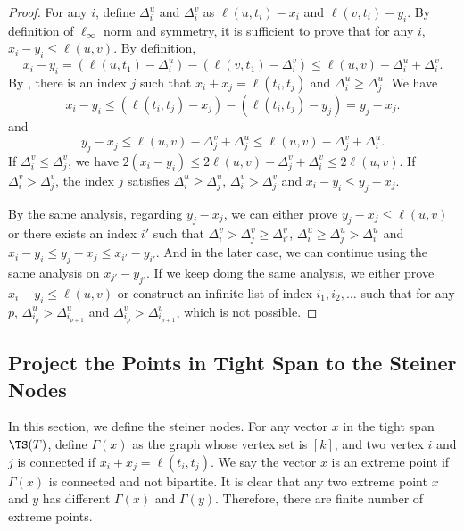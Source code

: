 \begin{proof}
    For any $i$, define $\Delta^u_i$ and $\Delta^v_i$ as $\ell(u,t_i) - x_i$ and $\ell(v,t_i) - y_i$. By definition of $\ell_{\infty}$ norm and symmetry, it is sufficient to prove that for any $i$, $x_i-y_i \le \ell(u,v)$. By definition, 
    $$x_i-y_i = (\ell(u,t_1) - \Delta^u_i) - (\ell(v,t_1) - \Delta^v_i) \le \ell(u,v) - \Delta^u_i + \Delta^v_i.$$ 
    By , there is an index $j$ such that $x_i+x_j = \ell(t_i,t_j)$ and $\Delta^u_i \ge \Delta^u_j$. We have 
    $$x_i-y_i \le (\ell(t_i,t_j) - x_j) - (\ell(t_i,t_j) - y_j) = y_j - x_j.$$
    and 
    $$
    y_j - x_j \le \ell(u,v) - \Delta^v_j + \Delta^u_j \le \ell(u,v) - \Delta^v_j + \Delta^u_i.
    $$
    If $\Delta^v_i \le \Delta^v_j$, we have $2(x_i-y_i) \le 2\ell(u,v) - \Delta^v_j + \Delta^v_i \le 2\ell(u,v)$. If $\Delta^v_i > \Delta^v_j$, the index $j$ satisfies $\Delta^u_i \ge \Delta^u_j$, $\Delta^v_i > \Delta^v_j$ and $x_i-y_i \le y_j-x_j$. 

    By the same analysis, regarding $y_j-x_j$, we can either prove $y_j-x_j \le \ell(u,v)$ or there exists an index $i'$ such that $\Delta^v_i > \Delta^v_j \ge \Delta^v_{i'}$, $\Delta^u_i \ge \Delta^u_j > \Delta^u_{i'}$ and $x_i-y_i \le y_j-x_j \le x_{i'}-y_{i'}$. And in the later case, we can continue using the same analysis on $x_{j'}-y_{j'}$. If we keep doing the same analysis, we either prove $x_i - y_i \le \ell(u,v)$ or construct an infinite list of index $i_1,i_2,\dots$ such that for any $p$, $\Delta^u_{i_p}>\Delta^u_{i_{p+1}}$ and $\Delta^v_{i_p}>\Delta^v_{i_{p+1}}$, which is not possible. 
\end{proof}

\subsection{Project the Points in Tight Span to the Steiner Nodes}
In this section, we define the steiner nodes. For any vector $x$ in the tight span $\TS(T)$, define $\Gamma(x)$ as the graph whose vertex set is $[k]$, and two vertex $i$ and $j$ is connected if $x_i+x_j = \ell(t_i,t_j)$. We say the vector $x$ is an extreme point if $\Gamma(x)$ is connected and not bipartite. It is clear that any two extreme point $x$ and $y$ has different $\Gamma(x)$ and $\Gamma(y)$. Therefore, there are finite number of extreme points. 


